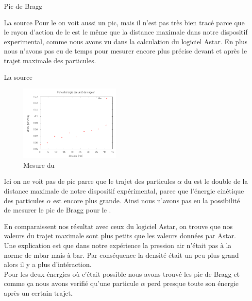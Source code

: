 \documentclass[a4paper,11pt,liststotocnumbered,bibtotocnumbered]{scrartcl}
\begin{document}
\begin{section}{Pic de Bragg}
\begin{subsection}{La source }
  Pour le  on voit aussi un pic, mais il n'est pas très bien tracé parce que le rayon d'action de le  est le même que la distance maximale dans notre dispositif experimental, comme nous avons vu dans la calculation du logiciel \glqq Astar\grqq. En plus nous n'avons pas eu de temps pour mesurer encore plus précise devant et après le trajet maximale des particules. 
 \end{subsection}
\enlargethispage{1,5cm}
 \begin{subsection}{La source }
  \begin{figure}[H]
   \begin{center}
    \includegraphics[width=0.45\textwidth]{Sabine/popic.png}
   \end{center}
   \caption{Mesure du }
  \end{figure} 

   Ici on ne voit pas de pic parce que le trajet des particules $\alpha$ du  est le double de la distance maximale de notre dispositif expérimental, parce que l'énergie cinétique des particules $\alpha$ est encore plus grande. Ainsi nous n'avons pas eu la possibilité de mesurer le pic de Bragg pour le . 
  \end{subsection}

\newpage
  En comparaissent nos résultat avec ceux du logiciel \flqq Astar\frqq, on trouve que nos valeurs du trajet maximale sont plus petits que les valeurs données par \flqq Astar\frqq. Une explication est que dans notre expérience la pression air n'était pas à la norme de \unit[1]{mbar} mais à \unit[0,994]{bar}. Par conséquence la densité était un peu plus grand alors il y a plus d'intéraction.\\ 
  Pour les deux énergies où c'était possible nous avons trouvé les pic de Bragg et comme \c ca nous avons verifié qu'une particule $\alpha$ perd presque toute son énergie après un certain trajet. 
 \end{section}
\end{document}
